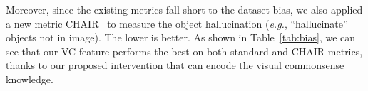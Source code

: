\documentclass[10pt,twocolumn,letterpaper]{article}
\newcommand\egs{\textit{e.g.}}
\begin{document}
Moreover, since the existing metrics fall short to the dataset bias, we also applied a new metric CHAIR~\cite{rohrbach2018object} to measure the object hallucination (\egs, ``hallucinate'' objects not in image). The lower is better.
As shown in Table~\ref{tab:bias}, we can see that our VC feature performs the best on both standard and CHAIR metrics, thanks to our proposed intervention that can encode the visual commonsense knowledge.




\begin{table}[]
\centering
{}
\end{table}
\end{document}
